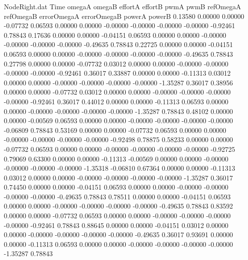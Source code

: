 \begin{filecontents}{NodeRight.dat}
Time omegaA omegaB effortA effortB pwmA pwmB refOmegaA refOmegaB errorOmegaA errorOmegaB powerA powerB
   0.13580    0.00000    0.00000    -0.07732    0.06593    0.00000    0.00000   -0.00000   -0.00000   -0.00000   -0.00000   -0.92461    0.78843
   0.17636    0.00000    0.00000    -0.04151    0.06593    0.00000    0.00000   -0.00000   -0.00000   -0.00000   -0.00000   -0.49635    0.78843
   0.22725    0.00000    0.00000    -0.04151    0.06593    0.00000    0.00000   -0.00000   -0.00000   -0.00000   -0.00000   -0.49635    0.78843
   0.27798    0.00000    0.00000    -0.07732    0.03012    0.00000    0.00000   -0.00000   -0.00000   -0.00000   -0.00000   -0.92461    0.36017
   0.33887    0.00000    0.00000    -0.11313    0.03012    0.00000    0.00000   -0.00000   -0.00000   -0.00000   -0.00000   -1.35287    0.36017
   0.38956    0.00000    0.00000    -0.07732    0.03012    0.00000    0.00000   -0.00000   -0.00000   -0.00000   -0.00000   -0.92461    0.36017
   0.44012    0.00000    0.00000    -0.11313    0.06593    0.00000    0.00000   -0.00000   -0.00000   -0.00000   -0.00000   -1.35287    0.78843
   0.48102    0.00000    0.00000    -0.00569    0.06593    0.00000    0.00000   -0.00000   -0.00000   -0.00000   -0.00000   -0.06809    0.78843
   0.53169    0.00000    0.00000    -0.07732    0.06593    0.00000    0.00000   -0.00000   -0.00000   -0.00000   -0.00000   -0.92498    0.78875
   0.58233    0.00000    0.00000    -0.07732    0.06593    0.00000    0.00000   -0.00000   -0.00000   -0.00000   -0.00000   -0.92725    0.79069
   0.63300    0.00000    0.00000    -0.11313   -0.00569    0.00000    0.00000   -0.00000   -0.00000   -0.00000   -0.00000   -1.35318   -0.06810
   0.67364    0.00000    0.00000    -0.11313    0.03012    0.00000    0.00000   -0.00000   -0.00000   -0.00000   -0.00000   -1.35287    0.36017
   0.74450    0.00000    0.00000    -0.04151    0.06593    0.00000    0.00000   -0.00000   -0.00000   -0.00000   -0.00000   -0.49635    0.78843
   0.78511    0.00000    0.00000    -0.04151    0.06593    0.00000    0.00000   -0.00000   -0.00000   -0.00000   -0.00000   -0.49635    0.78843
   0.83592    0.00000    0.00000    -0.07732    0.06593    0.00000    0.00000   -0.00000   -0.00000   -0.00000   -0.00000   -0.92461    0.78843
   0.88645    0.00000    0.00000    -0.04151    0.03012    0.00000    0.00000   -0.00000   -0.00000   -0.00000   -0.00000   -0.49635    0.36017
   0.93691    0.00000    0.00000    -0.11313    0.06593    0.00000    0.00000   -0.00000   -0.00000   -0.00000   -0.00000   -1.35287    0.78843

\end{filecontents}

